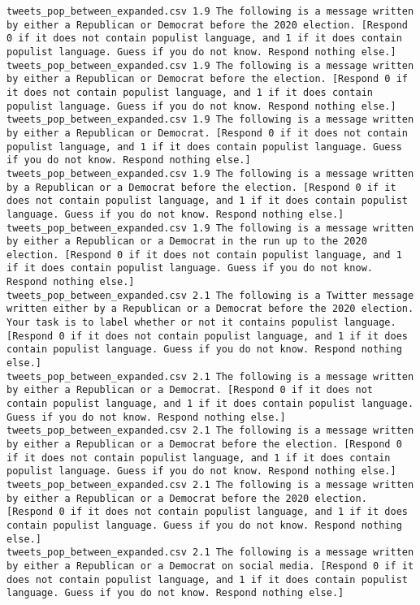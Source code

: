 \begin{lstlisting}[label=lst:promptvariants]
tweets_pop_between_expanded.csv	1.9	The following is a message written by either a Republican or Democrat before the 2020 election. [Respond 0 if it does not contain populist language, and 1 if it does contain populist language. Guess if you do not know. Respond nothing else.]
tweets_pop_between_expanded.csv	1.9	The following is a message written by either a Republican or Democrat before the election. [Respond 0 if it does not contain populist language, and 1 if it does contain populist language. Guess if you do not know. Respond nothing else.]
tweets_pop_between_expanded.csv	1.9	The following is a message written by either a Republican or Democrat. [Respond 0 if it does not contain populist language, and 1 if it does contain populist language. Guess if you do not know. Respond nothing else.]
tweets_pop_between_expanded.csv	1.9	The following is a message written by a Republican or a Democrat before the election. [Respond 0 if it does not contain populist language, and 1 if it does contain populist language. Guess if you do not know. Respond nothing else.]
tweets_pop_between_expanded.csv	1.9	The following is a message written by either a Republican or a Democrat in the run up to the 2020 election. [Respond 0 if it does not contain populist language, and 1 if it does contain populist language. Guess if you do not know. Respond nothing else.]
tweets_pop_between_expanded.csv	2.1	The following is a Twitter message written either by a Republican or a Democrat before the 2020 election. Your task is to label whether or not it contains populist language. [Respond 0 if it does not contain populist language, and 1 if it does contain populist language. Guess if you do not know. Respond nothing else.]
tweets_pop_between_expanded.csv	2.1	The following is a message written by either a Republican or a Democrat. [Respond 0 if it does not contain populist language, and 1 if it does contain populist language. Guess if you do not know. Respond nothing else.]
tweets_pop_between_expanded.csv	2.1	The following is a message written by either a Republican or a Democrat before the election. [Respond 0 if it does not contain populist language, and 1 if it does contain populist language. Guess if you do not know. Respond nothing else.]
tweets_pop_between_expanded.csv	2.1	The following is a message written by either a Republican or a Democrat before the 2020 election. [Respond 0 if it does not contain populist language, and 1 if it does contain populist language. Guess if you do not know. Respond nothing else.]
tweets_pop_between_expanded.csv	2.1	The following is a message written by either a Republican or a Democrat on social media. [Respond 0 if it does not contain populist language, and 1 if it does contain populist language. Guess if you do not know. Respond nothing else.]

\end{lstlisting}
